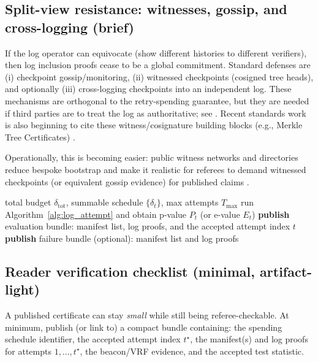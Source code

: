 \documentclass[11pt]{article}
\begin{document}
\subsection{Split-view resistance: witnesses, gossip, and cross-logging (brief)}
If the log operator can equivocate (show different histories to different verifiers), then log inclusion proofs cease to be a global commitment.
Standard defenses are (i) checkpoint gossip/monitoring, (ii) witnessed checkpoints (cosigned tree heads), and optionally (iii) cross-logging checkpoints into an independent log.
These mechanisms are orthogonal to the retry-spending guarantee, but they are needed if third parties are to treat the log as authoritative; see \cite{dahlberg2018ctgossip,syta2016cosi,dirksen2021logpicker,hicks2023sok_transparency}. Recent standards work is also beginning to cite these witness/cosignature building blocks (e.g., Merkle Tree Certificates) \cite{ietf_plants_merkle_tree_certs}.

Operationally, this is becoming easier: public witness networks and directories reduce bespoke bootstrap and make it realistic for referees to demand witnessed checkpoints (or equivalent gossip evidence) for published claims \cite{witness_network_blog_2024,trustfabric_witnesses_2025,filippo_keyserver_tlog_2025}.



\begin{algorithm}[t]
\caption{Notarized evaluation gate (approve-once)}\label{alg:release_gate}
\begin{algorithmic}[1]
\Require total budget $\delta_{\text{tot}}$, summable schedule $\{\delta_t\}$, max attempts $T_{\max}$
  \State run Algorithm~\ref{alg:log_attempt} and obtain p-value $P_t$ (or e-value $E_t$)
     \State \textbf{publish} evaluation bundle: manifest list, log proofs, and the accepted attempt index $t$
     \State \Return
  \EndIf
\EndFor
\State \textbf{publish} failure bundle (optional): manifest list and log proofs
\end{algorithmic}
\end{algorithm}
\subsection{Reader verification checklist (minimal, artifact-light)}
A published certificate can stay \emph{small} while still being referee-checkable.
At minimum, publish (or link to) a compact bundle containing: the spending schedule identifier, the accepted attempt index $t^\star$,
the manifest(s) and log proofs for attempts $1,\dots,t^\star$, the beacon/VRF evidence, and the accepted test statistic.
\end{document}
